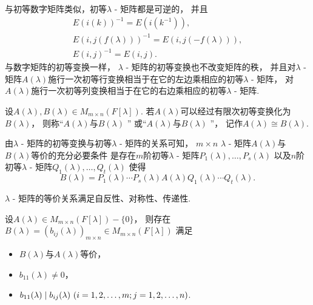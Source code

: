 与初等数字矩阵类似，初等\(\lambda\) - 矩阵都是可逆的，
并且\begin{gather*}
	E(i(k))^{-1}
	= E(i(k^{-1})), \\
	E(i,j(f(\lambda)))^{-1}
	= E(i,j(-f(\lambda))), \\
	E(i,j)^{-1} = E(i,j).
\end{gather*}
与数字矩阵的初等变换一样，
\(\lambda\) - 矩阵的初等变换也不改变矩阵的秩，
并且对\(\lambda\) - 矩阵\(A(\lambda)\)施行一次初等行变换相当于在它的左边乘相应的初等\(\lambda\) - 矩阵，
对\(A(\lambda)\)施行一次初等列变换相当于在它的右边乘相应的初等\(\lambda\) - 矩阵.

设\(A(\lambda), B(\lambda) \in M_{m \times n}(F[\lambda])\).
若\(A(\lambda)\)可以经过有限次初等变换化为\(B(\lambda)\)，
则称“\(A(\lambda)\)与\(B(\lambda)\) ”
或“\(A(\lambda)\)与\(B(\lambda)\) ”，
记作\(A(\lambda) \cong B(\lambda)\).

由\(\lambda\) - 矩阵的初等变换与初等\(\lambda\) - 矩阵的关系可知，
\(m \times n\) \(\lambda\) - 矩阵\(A(\lambda)\)与\(B(\lambda)\)等价的充分必要条件
是存在\(m\)阶初等\(\lambda\) - 矩阵\(P_1(\lambda),\dotsc,P_s(\lambda)\)
以及\(n\)阶初等\(\lambda\) - 矩阵\(Q_1(\lambda),\dotsc,Q_t(\lambda)\)
使得\begin{equation*}
	B(\lambda)
	= P_1(\lambda) \dotsm P_s(\lambda)
	A(\lambda)
	Q_1(\lambda) \dotsm Q_t(\lambda).
\end{equation*}

\(\lambda\) - 矩阵的等价关系满足自反性、对称性、传递性.

\begin{lemma}
设\(A(\lambda) \in M_{m \times n}(F[\lambda]) - \{0\}\)，
则存在\(B(\lambda) = (b_{ij}(\lambda))_{m \times n} \in M_{m \times n}(F[\lambda])\)
满足\begin{itemize}
	\item \(B(\lambda)\)与\(A(\lambda)\)等价，
	\item \(b_{11}(\lambda) \neq 0\)，
	\item \(
		\ExactlyDividedBy{ b_{ij}(\lambda) }{ b_{11}(\lambda) }  %
		\ (i=1,2,\dotsc,m;j=1,2,\dotsc,n)
	\).
\end{itemize}
\end{lemma}

